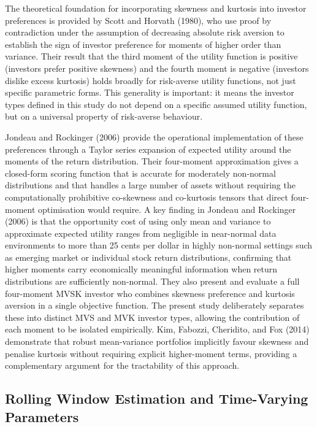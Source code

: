 \documentclass[12pt, a4paper]{article}
\begin{document}
The theoretical foundation for incorporating skewness and kurtosis into investor preferences
is provided by Scott and Horvath (1980), who use proof by contradiction under the assumption
of decreasing absolute risk aversion to establish the sign of investor preference for moments
of higher order than variance. Their result that the third moment of the utility function is
positive (investors prefer positive skewness) and the fourth moment is negative (investors
dislike excess kurtosis) holds broadly for risk-averse utility functions, not just specific
parametric forms. This generality is important: it means the investor types defined in this
study do not depend on a specific assumed utility function, but on a universal property of
risk-averse behaviour.

Jondeau and Rockinger (2006) provide the operational implementation of these preferences
through a Taylor series expansion of expected utility around the moments of the return
distribution. Their four-moment approximation gives a closed-form scoring function that is
accurate for moderately non-normal distributions and that handles a large number of assets
without requiring the computationally prohibitive co-skewness and co-kurtosis tensors that
direct four-moment optimisation would require. A key finding in Jondeau and Rockinger (2006)
is that the opportunity cost of using only mean and variance to approximate expected utility
ranges from negligible in near-normal data environments to more than 25 cents per dollar in
highly non-normal settings such as emerging market or individual stock return distributions,
confirming that higher moments carry economically meaningful information when return
distributions are sufficiently non-normal. They also present and evaluate a full four-moment
MVSK investor who combines skewness preference and kurtosis aversion in a single objective
function. The present study deliberately separates these into distinct MVS and MVK investor
types, allowing the contribution of each moment to be isolated empirically. Kim, Fabozzi,
Cheridito, and Fox (2014) demonstrate that robust mean-variance portfolios implicitly favour
skewness and penalise kurtosis without requiring explicit higher-moment terms, providing a
complementary argument for the tractability of this approach.

\subsection{Rolling Window Estimation and Time-Varying Parameters}
\end{document}
